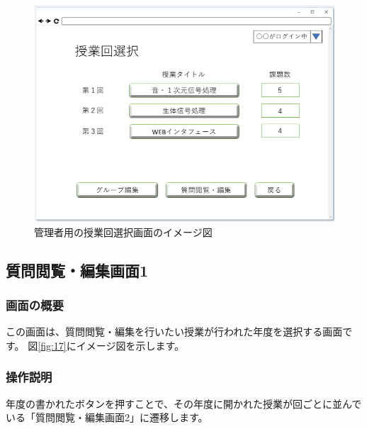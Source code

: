 \begin{figure}[htbp]
  \begin{center}
    \includegraphics[width=1\linewidth,clip]{./img/16.png}
    \caption{管理者用の授業回選択画面のイメージ図}\label{fig:16}
  \end{center}
\end{figure}

\newpage

\subsection{質問閲覧・編集画面1}
\subsubsection{画面の概要}
この画面は、質問閲覧・編集を行いたい授業が行われた年度を選択する画面です。
図\ref{fig:17}にイメージ図を示します。

\subsubsection{操作説明}
年度の書かれたボタンを押すことで、その年度に開かれた授業が回ごとに並んでいる「質問閲覧・編集画面2」に遷移します。

